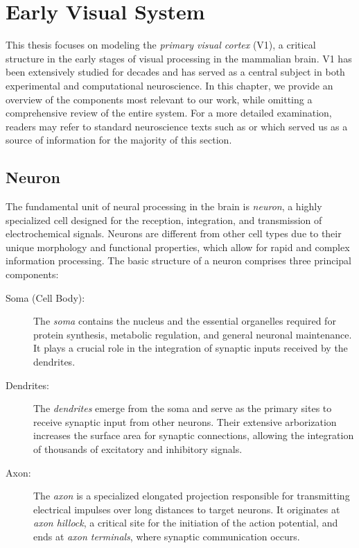 \chapter{Early Visual System}
\label{chap:visual_system}
This thesis focuses on modeling the \emph{primary visual cortex} (V1), a
critical structure in the early stages of visual processing in the mammalian
brain. V1 has been extensively studied for decades and has served as a central subject
in both experimental and computational neuroscience. In this chapter, we
provide an overview of the components most relevant to our work, while
omitting a comprehensive review of the entire system. For a more detailed
examination, readers may refer to standard neuroscience texts such as
\citet{bear2020neuroscience} or \citet{goebel2004visual} which served
us as a source of information for the majority of this section.

\section{Neuron}
\label{sec:neuron}
The fundamental unit of neural processing in the brain is \emph{neuron}, a highly
specialized cell designed for the reception, integration, and transmission of
electrochemical signals. Neurons are different from other cell types due to their
unique morphology and functional properties, which allow for rapid and complex information
processing. The basic structure of a neuron comprises three principal components:

\begin{description}
    \item[Soma (Cell Body):] The \emph{soma} contains the nucleus and the essential organelles required for protein synthesis, metabolic regulation, and general neuronal maintenance. It plays a crucial role in the integration of synaptic inputs received by the dendrites.

    \item[Dendrites:] The \emph{dendrites} emerge from the soma and serve as the primary sites to receive synaptic input from other neurons.
    Their extensive arborization increases the surface area for synaptic connections, allowing the integration of thousands of excitatory and inhibitory signals.

    \item[Axon:] The \emph{axon} is a specialized elongated projection responsible for transmitting electrical impulses over long distances to target neurons. It originates at \emph{axon hillock}, a critical site for the initiation of the action potential, and ends at \emph{axon terminals}, where synaptic communication occurs.
\end{description}

